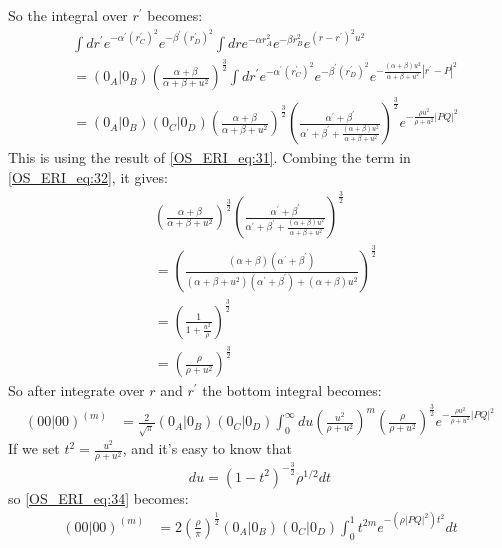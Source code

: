  So the integral over $r^{'}$ becomes:
\begin{equation}
 \begin{split}
   &\int dr^{'}  e^{-\alpha^{'} (r^{'}_{C})^{2}}e^{-\beta^{'} (r^{'}_{D})^{2}} 
   \int dr  e^{-\alpha r_{A}^{2}} e^{-\beta r_{B}^{2}} e^{(r-r^{'})^{2}u^{2}} \\
&= (0_{A}|0_{B})\left( \frac{\alpha+\beta}{\alpha+\beta+u^{2}}\right)^{\frac{3}{2}}   
  \int dr^{'}  e^{-\alpha^{'} (r^{'}_{C})^{2}}e^{-\beta^{'} (r^{'}_{D})^{2}} 
   e^{-\frac{(\alpha+\beta)u^{2}}{\alpha+\beta+u^{2}}|r^{'}-P|^{2}} \\
&= (0_{A}|0_{B})(0_{C}|0_{D})
\left( \frac{\alpha+\beta}{\alpha+\beta+u^{2}}\right)^{\frac{3}{2}} 
\left( \frac{\alpha^{'}+\beta^{'}}{\alpha^{'}+\beta^{'}+ 
\frac{(\alpha+\beta)u^{2}}{\alpha+\beta+u^{2}}}\right)^{\frac{3}{2}}
e^{-\frac{\rho u^{2}}{\rho+ u^{2}}|PQ|^{2}}
\end{split} 
\label{OS_ERI_eq:32}
\end{equation}
This is using the result of \ref{OS_ERI_eq:31}. Combing the term in \ref{OS_ERI_eq:32},
it gives:
\begin{equation}
\begin{split}
 &\left( \frac{\alpha+\beta}{\alpha+\beta+u^{2}}\right)^{\frac{3}{2}} 
\left( \frac{\alpha^{'}+\beta^{'}}{\alpha^{'}+\beta^{'}+ 
\frac{(\alpha+\beta)u^{2}}{\alpha+\beta+u^{2}}}\right)^{\frac{3}{2}} \\
&= \left( \frac{(\alpha+\beta)(\alpha^{'}+\beta^{'})}
{(\alpha+\beta+u^{2})(\alpha^{'}+\beta^{'})+(\alpha+\beta)u^{2}}\right)^{\frac{3}{2}}\\
&= \left(\frac{1}{1+\frac{u^{2}}{\rho}}\right)^{\frac{3}{2}} \\
&= \left(\frac{\rho}{\rho+u^{2}}\right)^{\frac{3}{2}}
\end{split}
 \label{OS_ERI_eq:33}
\end{equation}
So after integrate over $r$ and $r^{'}$ the bottom integral becomes:
\begin{equation}
 \begin{split}
 (00|00)^{(m)} &=\frac{2}{\sqrt{\pi}}(0_{A}|0_{B})(0_{C}|0_{D})
 \int_{0}^{\infty} du \left( \frac{u^{2}}{\rho+u^{2}}\right)^{m}
 \left(\frac{\rho}{\rho+u^{2}}\right)^{\frac{3}{2}}
 e^{-\frac{\rho u^{2}}{\rho+ u^{2}}|PQ|^{2}} 
 \end{split}
\label{OS_ERI_eq:34}
\end{equation}
If we set $t^{2} = \frac{u^{2}}{\rho+ u^{2}}$, and it's easy to know
that 
\begin{equation}
 du = (1-t^{2})^{-\frac{3}{2}}\rho^{1/2} dt
\end{equation}
so \ref{OS_ERI_eq:34} becomes:
\begin{equation}
 \begin{split}
 (00|00)^{(m)} &= 2\left( \frac{\rho}{\pi}\right)^{\frac{1}{2}}(0_{A}|0_{B})
(0_{C}|0_{D})\int^{1}_{0} t^{2m} e^{-(\rho|PQ|^{2})t^{2}} dt 
 \end{split}
\label{OS_ERI_complementary_result}
\end{equation}

